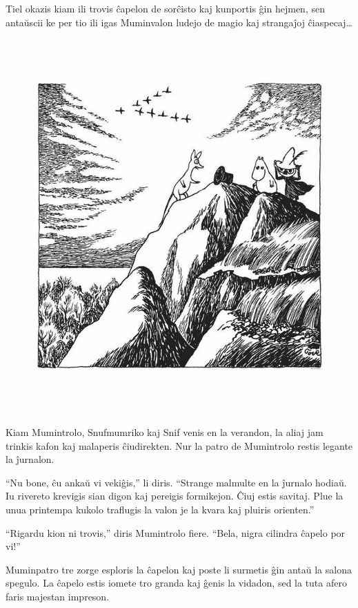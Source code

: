 Tiel okazis kiam ili trovis ĉapelon de sorĉisto kaj kunportis ĝin hejmen, sen antaŭscii ke per tio ili igas Muminvalon ludejo de magio kaj strangaĵoj ĉiaspecaj{\ldots}

\begin{figure}[htbp]
\centering
\includegraphics[width=406pt,height=406pt]{_3.jpg}
\caption{}
\label{_3}
\end{figure}

Kiam Mumintrolo, Snufmumriko kaj Snif venis en la verandon, la aliaj jam trinkis kafon kaj malaperis ĉiudirekten. Nur la patro de Mumintrolo restis legante la ĵurnalon.

``Nu bone, ĉu ankaŭ vi vekiĝis,'' li diris. ``Strange malmulte en la ĵurnalo hodiaŭ. Iu rivereto krevigis sian digon kaj pereigis formikejon. Ĉiuj estis savitaj. Plue la unua printempa kukolo traflugis la valon je la kvara kaj pluiris orienten.''

``Rigardu kion ni trovis,'' diris Mumintrolo fiere. ``Bela, nigra cilindra ĉapelo por vi!''

Muminpatro tre zorge esploris la ĉapelon kaj poste li surmetis ĝin antaŭ la salona spegulo. La ĉapelo estis iomete tro granda kaj ĝenis la vidadon, sed la tuta afero faris majestan impreson.

